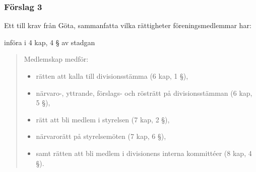 \documentclass[protokoll]{dvd}
\begin{document}
\subsubsection*{Förslag 3}
Ett till krav från Göta, sammanfatta vilka rättigheter föreningsmedlemmar har:
\begin{attsatser}
    \item införa i 4 kap, 4 § av stadgan 
    \begin{quote}
        Medlemskap medför: 
        \begin{itemize}
            \item rätten att kalla till divisionsstämma (6 kap, 1 §),
            \item närvaro-, yttrande, förslags- och rösträtt på divisionsstämman (6 kap, 5 §),
            \item rätt att bli medlem i styrelsen (7 kap, 2 §),
            \item närvarorätt på styrelsemöten (7 kap, 6 §),
            \item samt rätten att bli medlem i divisionens interna kommittéer (8 kap, 4 §).
        \end{itemize}
    \end{quote}
\end{attsatser}
\end{document}
